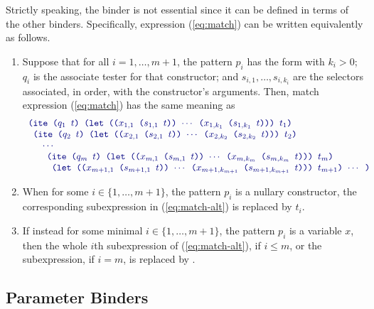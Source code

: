 Strictly speaking, the  binder is not essential 
since it can be defined in terms of the other binders. 
Specifically, expression (\ref{eq:match})
can be written equivalently as follows.
\begin{enumerate}
\item
Suppose that for all $i=1,\ldots, m + 1$, the pattern $p_i$ has the form
 with $k_i>0$;
$q_i$ is the associate tester for that constructor; and
$s_{i,1}, \ldots, s_{i,k_i}$ are the selectors associated, in order,
with the constructor's arguments.
Then, match expression (\ref{eq:match}) has the same meaning as 
%
\begin{equation} \label{eq:match-alt}
\begin{array}{l}
\expr{(ite ($q_1$ $t$) 
 (let (($x_{1,1}$ ($s_{1,1}$ $t$)) $\cdots$ ($x_{1,k_1}$ ($s_{1,k_1}$ $t$))) $t_1$)}
\\
\expr{ (ite ($q_2$ $t$) 
 (let (($x_{2,1}$ ($s_{2,1}$ $t$)) $\cdots$ ($x_{2,k_2}$ ($s_{2,k_2}$ $t$))) $t_2$)}
\\
\quad \expr{ $\cdots$}
\\
\quad\quad\expr{(ite ($q_m$ $t$) 
 (let (($x_{m,1}$ ($s_{m,1}$ $t$)) $\cdots$ ($x_{m,k_m}$ ($s_{m,k_m}$ $t$))) $t_m$)}
\\
\quad\quad\expr{ (let (($x_{m+1,1}$ ($s_{m+1,1}$ $t$)) $\cdots$ ($x_{m+1,k_{m+1}}$ ($s_{m+1,k_{m+1}}$ $t$))) $t_{m+1}$) $\cdots$ ) }
\end{array}
\end{equation}

\item 
When for some $i \in \{1,\ldots, m + 1\}$, the pattern $p_i$ is a nullary constructor, 
the corresponding  subexpression in (\ref{eq:match-alt}) is replaced 
by $t_i$.

\item 
If instead for some minimal $i \in \{1,\ldots, m + 1\}$, the pattern $p_i$ is
a variable $x$, then the whole $i$th  subexpression of (\ref{eq:match-alt}),
if $i\leq m$, 
or the  subexpression, if $i=m$, is replaced by .
\end{enumerate}


\subsection{Parameter Binders}

